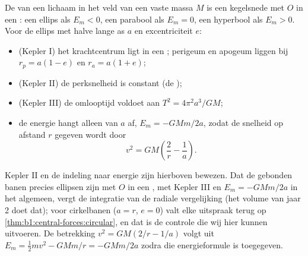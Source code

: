\begin{theorem}\label{thm:b1:central-forces:conics}
De  van een lichaam in het veld van een vaste massa $M$ is een kegelsnede
met $O$ in een : een ellips als $E_m < 0$, een parabool als $E_m = 0$,
een hyperbool als $E_m > 0$. Voor de ellips met halve lange as $a$ en
excentriciteit $e$:
\begin{itemize}
  \item (Kepler I) het krachtcentrum ligt in een ; perigeum en apogeum
        liggen bij $r_p = a(1 - e)$ en $r_a = a(1 + e)$;
  \item (Kepler II) de perksnelheid is constant (de );
  \item (Kepler III) de omlooptijd voldoet aan $T^2 = 4\pi^2a^3/GM$;
  \item de energie hangt alleen van $a$ af, $E_m = -GMm/2a$, zodat de
        snelheid op afstand $r$ gegeven wordt door
        \[
        v^2 = GM\left(\frac{2}{r} - \frac{1}{a}\right) .
        \]
\end{itemize}
\end{theorem}
\admitted

\begin{remark}\label{rem:b1:central-forces:admitted}
Kepler II en de indeling naar energie zijn hierboven bewezen. Dat de
gebonden banen precies ellipsen zijn met $O$ in een , met Kepler III
en $E_m = -GMm/2a$ in het algemeen, vergt de integratie van de radiale
vergelijking (het volume van jaar 2 doet dat); voor cirkelbanen ($a = r$,
$e = 0$) valt elke uitspraak terug op \cref{thm:b1:central-forces:circular},
en dat is de controle die wij hier kunnen uitvoeren. De betrekking $v^2 = GM(2/r - 1/a)$
volgt uit $E_m = \tfrac12 mv^2 - GMm/r = -GMm/2a$ zodra die
energieformule is toegegeven.
\end{remark}

